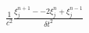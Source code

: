 \documentclass[preview]{standalone}
\begin{document}
\begin{align*}
\frac{1}{c^2}\frac{\xi_{j}^{n+1} - -2 \xi_{j}^{n} + \xi_{j}^{n-1}}{\delta t^2}
\end{align*}
\end{document}

